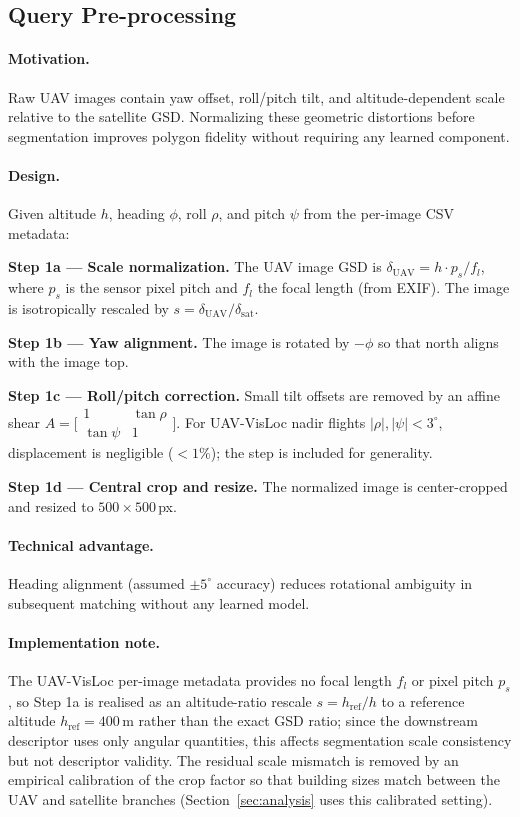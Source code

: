 \documentclass[10pt]{article}
\theoremstyle{plain}
\theoremstyle{definition}
\begin{document}
\subsection{Query Pre-processing}
\label{sec:preproc}

\paragraph{Motivation.}
Raw UAV images contain yaw offset, roll/pitch tilt, and altitude-dependent
scale relative to the satellite GSD.
Normalizing these geometric distortions before segmentation improves polygon
fidelity without requiring any learned component.

\paragraph{Design.}
Given altitude $h$, heading $\phi$, roll $\rho$, and pitch $\psi$ from the
per-image CSV metadata:

\noindent\textbf{Step 1a --- Scale normalization.}
The UAV image GSD is $\delta_{\mathrm{UAV}} = h \cdot p_s / f_l$, where $p_s$
is the sensor pixel pitch and $f_l$ the focal length (from EXIF).
The image is isotropically rescaled by
$s = \delta_{\mathrm{UAV}} / \delta_{\mathrm{sat}}$.

\noindent\textbf{Step 1b --- Yaw alignment.}
The image is rotated by $-\phi$ so that north aligns with the image top.

\noindent\textbf{Step 1c --- Roll/pitch correction.}
Small tilt offsets are removed by an affine shear
$A = \bigl[\begin{smallmatrix}1 & \tan\rho \\ \tan\psi & 1\end{smallmatrix}\bigr]$.
For UAV-VisLoc nadir flights $|\rho|,|\psi|<3^\circ$, displacement is
negligible ($<1\%$); the step is included for generality.

\noindent\textbf{Step 1d --- Central crop and resize.}
The normalized image is center-cropped and resized to $500\!\times\!500$\,px.

\paragraph{Technical advantage.}
Heading alignment (assumed $\pm5^\circ$ accuracy) reduces rotational ambiguity
in subsequent matching without any learned model.

\paragraph{Implementation note.}
The UAV-VisLoc per-image metadata provides no focal length $f_l$ or pixel
pitch $p_s$, so Step 1a is realised as an altitude-ratio rescale
$s = h_{\mathrm{ref}} / h$ to a reference altitude $h_{\mathrm{ref}} = 400$\,m
rather than the exact GSD ratio; since the downstream descriptor uses only
angular quantities, this affects segmentation scale consistency but not
descriptor validity.
The residual scale mismatch is removed by an empirical calibration of the crop
factor so that building sizes match between the UAV and satellite branches
(Section~\ref{sec:analysis} uses this calibrated setting).
\end{document}
